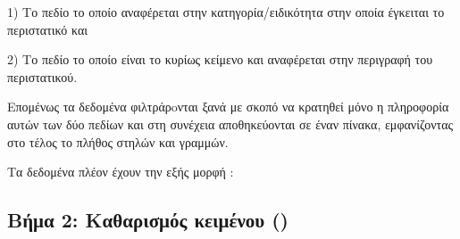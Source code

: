 1) Το πεδίο  το οποίο αναφέρεται στην κατηγορία/ειδικότητα στην οποία έγκειται το περιστατικό και 

2) Το πεδίο  το οποίο είναι το κυρίως κείμενο και αναφέρεται στην περιγραφή του περιστατικού.  

Επομένως τα δεδομένα φιλτράρoνται ξανά με σκοπό να κρατηθεί μόνο η πληροφορία αυτών των δύο πεδίων και στη συνέχεια αποθηκεύονται σε έναν πίνακα, εμφανίζοντας στο τέλος το πλήθος στηλών και γραμμών. 

Τα δεδομένα πλέον έχουν την εξής μορφή : 

\subsection{Βήμα 2: Kαθαρισμός κειμένου ()}

